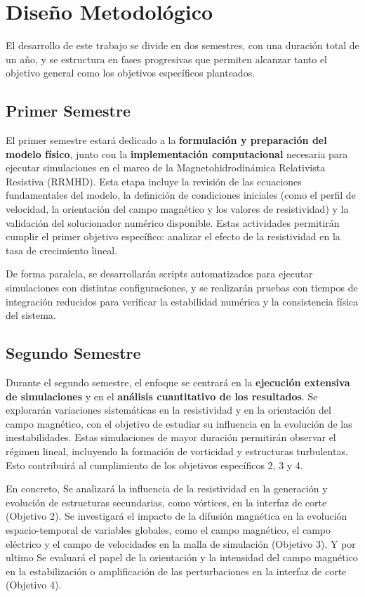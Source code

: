 \section{Diseño Metodológico}

El desarrollo de este trabajo se divide en dos semestres, con una duración total de un año, y se estructura en fases progresivas que permiten alcanzar tanto el objetivo general como los objetivos específicos planteados.

\subsection*{Primer Semestre}

El primer semestre estará dedicado a la \textbf{formulación y preparación del modelo físico}, junto con la \textbf{implementación computacional} necesaria para ejecutar simulaciones en el marco de la Magnetohidrodinámica  Relativista Resistiva (RRMHD). Esta etapa incluye la revisión de las ecuaciones fundamentales del modelo, la definición de condiciones iniciales (como el perfil de velocidad, la orientación del campo magnético y los valores de resistividad) y la validación del solucionador numérico disponible. Estas actividades permitirán cumplir el primer objetivo específico: analizar el efecto de la resistividad en la tasa de crecimiento lineal.

De forma paralela, se desarrollarán scripts automatizados para ejecutar simulaciones con distintas configuraciones, y se realizarán pruebas con tiempos de integración reducidos para verificar la estabilidad numérica y la consistencia física del sistema.

\subsection*{Segundo Semestre}

Durante el segundo semestre, el enfoque se centrará en la \textbf{ejecución extensiva de simulaciones} y en el \textbf{análisis cuantitativo de los resultados}. Se explorarán variaciones sistemáticas en la resistividad y en la orientación del campo magnético, con el objetivo de estudiar su influencia en la evolución de las inestabilidades. Estas simulaciones de mayor duración permitirán observar el régimen lineal, incluyendo la formación de vorticidad y estructuras turbulentas. Esto contribuirá al cumplimiento de los objetivos específicos 2, 3 y 4.

En concreto, Se analizará la influencia de la resistividad en la generación y evolución de estructuras secundarias, como vórtices, en la interfaz de corte (Objetivo 2).
Se investigará el impacto de la difusión magnética en la evolución espacio-temporal de variables globales, como el campo magnético, el campo eléctrico y el campo de velocidades en la malla de simulación (Objetivo 3).
Y por ultimo Se evaluará el papel de la orientación y la intensidad del campo magnético en la estabilización o amplificación de las perturbaciones en la interfaz de corte (Objetivo 4).

